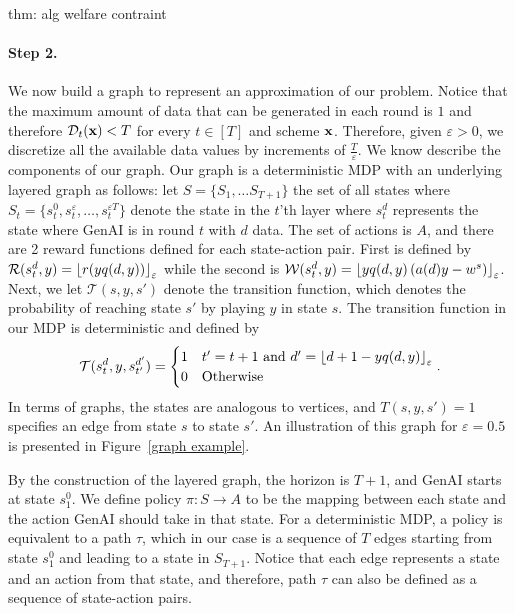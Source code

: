\begin{proofof}{thm: alg welfare contraint}
\paragraph{Step 2.} We now build a graph to represent an approximation of our problem. Notice that the maximum amount of data that can be generated in each round is $1$ and therefore $\mathcal{D}_t({\bf{x}}) < T$ for every $t \in [T]$ and scheme ${\bf{x}}$. Therefore, given $\varepsilon > 0$, we discretize all the available data values by increments of $\frac{T}{\varepsilon}$. We know describe the components of our graph. Our graph is a deterministic MDP with an underlying layered graph as follows: let $S = \{S_1, \ldots S_{T+1} \}$ the set of all states where $S_t = \{ s_t^0, s_t^\varepsilon, \ldots, s_t^{\varepsilon T} \}$ denote the state in the $t$'th layer where $s_t^d$ represents the state where GenAI is in round $t$ with $d$ data. The set of actions is $A$, and there are 2 reward functions defined for each state-action pair. First is defined by $\mathcal{R}(s_t^{d}, y) = {\left\lfloor r(yq(d, y))\right\rfloor_{\varepsilon}}$ while the second is $\mathcal{W}(s_t^{d}, y) = {\left\lfloor yq(d, y) \left(a(d)y - w^s\right)\right\rfloor_{\varepsilon}}$. Next, we let $\mathcal{T}(s, y, s')$ denote the transition function, which denotes the probability of reaching state $s'$ by playing $y$ in state $s$. The transition function in our MDP is deterministic and defined by
\begin{align*}
\mathcal{T}(s_t^{d}, y, s_{t'}^{d'}) = \begin{cases}
    1 & \mbox{$t' = t+1$ and $d' = {\left\lfloor d + 1- yq(d, y)\right\rfloor_{\varepsilon}}$} \\
    0 & \mbox{Otherwise}
\end{cases}.
\end{align*}
In terms of graphs, the states are analogous to vertices, and $T(s, y, s') = 1$ specifies an edge from state $s$ to state $s'$. An illustration of this graph for $\varepsilon = 0.5$ is presented in Figure~\ref{graph example}.



By the construction of the layered graph, the horizon is $T+1$, and GenAI starts at state $s_1^0$. We define policy $\pi : S \rightarrow A$ to be the mapping between each state and the action GenAI should take in that state. For a deterministic MDP, a policy is equivalent to a path $\tau$, which in our case is a sequence of $T$ edges starting from state $s_1^0$ and leading to a state in $S_{T+1}$. Notice that each edge represents a state and an action from that state, and therefore, path $\tau$ can also be defined as a sequence of state-action pairs.


\end{proofof}
